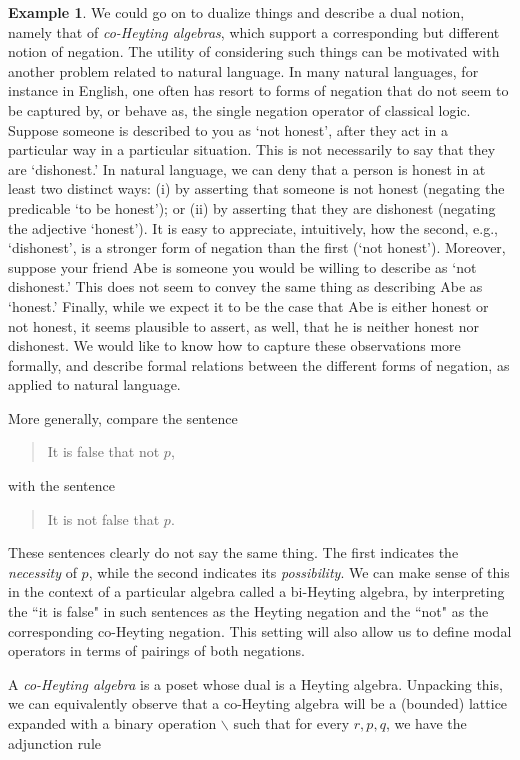 \documentclass[11pt]{book}
\theoremstyle{definition}
\newtheorem{example}{Example}[section]
\theoremstyle{definition}
\theoremstyle{definition}
\theoremstyle{theorem}
\theoremstyle{definition}
\begin{document}
\begin{example}
	We could go on to dualize things and describe a dual notion, namely that of \textit{co-Heyting algebras}, which support a corresponding but different notion of negation. The utility of considering such things can be motivated with another problem related to natural language. In many natural languages, for instance in English, one often has resort to forms of negation that do not seem to be captured by, or behave as, the single negation operator of classical logic. Suppose someone is described to you as `not honest', after they act in a particular way in a particular situation. This is not necessarily to say that they are `dishonest.' In natural language, we can deny that a person is honest in at least two distinct ways: (i) by asserting that someone is not honest (negating the predicable `to be honest'); or (ii) by asserting that they are dishonest (negating the adjective `honest'). It is easy to appreciate, intuitively, how the second, e.g., `dishonest', is a stronger form of negation than the first (`not honest'). Moreover, suppose your friend Abe is someone you would be willing to describe as `not dishonest.' This does not seem to convey the same thing as describing Abe as `honest.' Finally, while we expect it to be the case that Abe is either honest or not honest, it seems plausible to assert, as well, that he is neither honest nor dishonest.  We would like to know how to capture these observations more formally, and describe formal relations between the different forms of negation, as applied to natural language. \par
	More generally, compare the sentence
	\begin{quote}
		It is false that not $p$,
	\end{quote}  
	with the sentence 
	\begin{quote}
		It is not false that $p$. 
	\end{quote}
	These sentences clearly do not say the same thing. The first indicates the \textit{necessity} of $p$, while the second indicates its \textit{possibility}. We can make sense of this in the context of a particular algebra called a bi-Heyting algebra, by interpreting the ``it is false" in such sentences as the Heyting negation and the ``not" as the corresponding co-Heyting negation. This setting will also allow us to define modal operators in terms of pairings of both negations. \par 
	A \textit{co-Heyting algebra} is a poset whose dual is a Heyting algebra. Unpacking this, we can equivalently observe that a co-Heyting algebra will be a (bounded) lattice expanded with a binary operation $\smallsetminus$ such that for every $r, p, q$, we have the adjunction rule 

\end{example}
\end{document}
